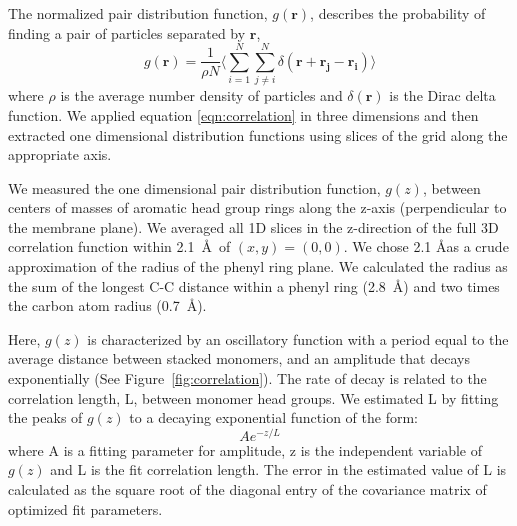 \documentclass[journal=jpcbfk,manusciprt=article]{achemso}
\begin{document}
  The normalized pair distribution function, $g(\mathbf{r})$, describes
  the probability of finding a pair of particles separated by $\mathbf{r}$,
  \begin{equation}
	g(\mathbf{r})= \frac{1}{\rho N} \Bigg \langle \sum_{i=1}^{N}\sum_{j\neq i}^{N} \delta(\mathbf{r}+\mathbf{r_j}-\mathbf{r_i}) \Bigg \rangle
	\label{eqn:correlation}
  \end{equation}
  where $\rho$ is the average number density of particles and
  $\delta(\mathbf{r})$ is the Dirac delta function\cite{kuriabova_linear_2010}.
  We applied equation \ref{eqn:correlation} in three dimensions and then
  extracted one dimensional distribution functions using slices of the grid
  along the appropriate axis.

  We measured the one dimensional pair distribution function, $g(z)$, between centers 
  of masses of aromatic head group rings along the z-axis (perpendicular to
  the membrane plane). We averaged all 1D slices in the z-direction of the full 3D 
  correlation function within 2.1~\AA~of $(x, y)=(0, 0)$. We chose 2.1 \AA as a crude 
  approximation of the radius of the phenyl ring plane. 
  We calculated the radius as the sum of the longest C-C distance within a phenyl 
  ring (2.8~\AA) and two times the carbon atom radius (0.7~\AA).
  
  Here, $g(z)$ is characterized by an oscillatory function with a period equal to the
  average distance between stacked monomers, and an amplitude that decays exponentially
  (See Figure~\ref{fig:correlation}). The rate of decay is related to the correlation 
  length, L, between monomer head groups. We estimated L by fitting the peaks of $g(z)$
  to a decaying exponential function of the form:
  \begin{equation}
  	Ae^{-z/L}
  	\label{eqn:decaying_exponential}
  \end{equation}
  where A is a fitting parameter for amplitude, z is the independent variable of $g(z)$ 
  and L is the fit correlation length. The error in the estimated value of L is 
  calculated as the square root of the diagonal entry of the covariance matrix of 
  optimized fit parameters.
  
\end{document}
